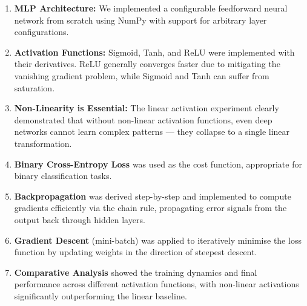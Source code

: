\documentclass[11pt]{article}
\begin{document}
\begin{enumerate}
\def\labelenumi{\arabic{enumi}.}
\item
  \textbf{MLP Architecture:} We implemented a configurable feedforward
  neural network from scratch using NumPy with support for arbitrary
  layer configurations.
\item
  \textbf{Activation Functions:} Sigmoid, Tanh, and ReLU were
  implemented with their derivatives. ReLU generally converges faster
  due to mitigating the vanishing gradient problem, while Sigmoid and
  Tanh can suffer from saturation.
\item
  \textbf{Non-Linearity is Essential:} The linear activation experiment
  clearly demonstrated that without non-linear activation functions,
  even deep networks cannot learn complex patterns --- they collapse to
  a single linear transformation.
\item
  \textbf{Binary Cross-Entropy Loss} was used as the cost function,
  appropriate for binary classification tasks.
\item
  \textbf{Backpropagation} was derived step-by-step and implemented to
  compute gradients efficiently via the chain rule, propagating error
  signals from the output back through hidden layers.
\item
  \textbf{Gradient Descent} (mini-batch) was applied to iteratively
  minimise the loss function by updating weights in the direction of
  steepest descent.
\item
  \textbf{Comparative Analysis} showed the training dynamics and final
  performance across different activation functions, with non-linear
  activations significantly outperforming the linear baseline.
\end{enumerate}


    
    
    
\end{document}
